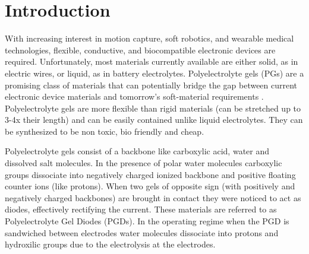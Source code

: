 \documentclass[twoside,twocolumn,9pt]{article}
\begin{document}






\section{Introduction}


With increasing interest in motion capture, soft robotics, and wearable medical technologies, flexible, conductive, and biocompatible electronic devices are required. Unfortunately, most materials currently available are either solid, as in electric wires, or liquid, as in battery electrolytes. Polyelectrolyte gels (PGs) are a promising class of materials that can potentially bridge the gap between current electronic device materials and tomorrow’s soft-material requirements \cite{Huang2018BioinspiredBipolar,Han2009IonicMicrochip,Larson2016HighlySensing}. Polyelectrolyte gels are more flexible than rigid materials (can be stretched up to 3-4x their length) and can be easily contained unlike liquid electrolytes. They can be synthesized to be non toxic, bio friendly and cheap.


Polyelectrolyte gels consist of a backbone like carboxylic acid, water and dissolved salt molecules. In the presence of polar water molecules carboxylic groups dissociate into negatively charged ionized backbone and positive floating counter ions (like protons). When two gels of opposite sign (with positively and negatively charged backbones) are brought in contact they were noticed to act as diodes, effectively  rectifying the current. These materials are referred to as Polyelectrolyte Gel Diodes (PGDs). In the operating regime when the PGD is sandwiched between electrodes water molecules dissociate into protons and hydroxilic groups due to the electrolysis at the electrodes.
\end{document}
